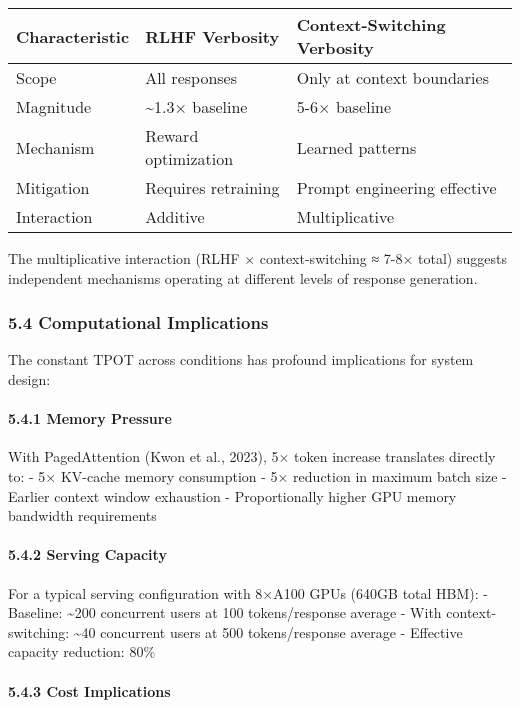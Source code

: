 \documentclass[
  11pt]{article}
\begin{document}
\begin{longtable}[]{@{}lll@{}}
\toprule\noalign{}
Characteristic & RLHF Verbosity & Context-Switching Verbosity \\
\midrule\noalign{}
\endhead
\bottomrule\noalign{}
\endlastfoot
Scope & All responses & Only at context boundaries \\
Magnitude & \textasciitilde1.3× baseline & 5-6× baseline \\
Mechanism & Reward optimization & Learned patterns \\
Mitigation & Requires retraining & Prompt engineering effective \\
Interaction & Additive & Multiplicative \\
\end{longtable}

The multiplicative interaction (RLHF × context-switching ≈ 7-8× total)
suggests independent mechanisms operating at different levels of
response generation.

\subsubsection{5.4 Computational
Implications}\label{computational-implications}

The constant TPOT across conditions has profound implications for system
design:

\paragraph{5.4.1 Memory Pressure}\label{memory-pressure}

With PagedAttention (Kwon et al., 2023), 5× token increase translates
directly to: - 5× KV-cache memory consumption - 5× reduction in maximum
batch size - Earlier context window exhaustion - Proportionally higher
GPU memory bandwidth requirements

\paragraph{5.4.2 Serving Capacity}\label{serving-capacity}

For a typical serving configuration with 8×A100 GPUs (640GB total HBM):
- Baseline: \textasciitilde200 concurrent users at 100 tokens/response
average - With context-switching: \textasciitilde40 concurrent users at
500 tokens/response average - Effective capacity reduction: 80\%

\paragraph{5.4.3 Cost Implications}\label{cost-implications}
\end{document}
